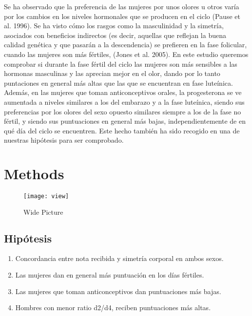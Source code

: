 \documentclass[fleqn,10pt]{SelfArx} %
\begin{document}
Se ha observado que la preferencia de las mujeres por unos olores u otros varía por los cambios en los niveles hormonales que se producen en el ciclo (Pause et al. 1996). Se ha visto cómo los rasgos como la masculinidad y la simetría, asociados con beneficios indirectos (es decir, aquellas que reflejan la buena calidad genética y que pasarán a la descendencia) se prefieren en la fase folicular, cuando las mujeres son más fértiles, (Jones et al. 2005). En este estudio queremos comprobar si durante la fase fértil del ciclo las mujeres son más sensibles a las hormonas masculinas y las aprecian mejor en el olor, dando por lo tanto puntaciones en general más altas que las que se encuentran en fase luteínica. Además, en las mujeres que toman anticonceptivos orales, la progesterona se ve aumentada a niveles similares a los del embarazo y a la fase luteínica, siendo sus preferencias por los olores del sexo opuesto similares siempre a los de la fase no fértil, y siendo sus puntuaciones en general más bajas, independientemente de en qué día del ciclo se encuentren. Este hecho también ha sido recogido en una de nuestras hipótesis para ser comprobado.


\section{Methods}

\begin{figure*}[ht]\centering %
	\texttt{[image: view]}
	\caption{Wide Picture}
	\label{fig:view}
\end{figure*}

\subsection{Hipótesis}

\begin{enumerate}[noitemsep] %
	\item Concordancia entre nota recibida y simetría corporal en ambos sexos.
	\item Las mujeres dan en general más puntuación en los días fértiles.
	\item Las mujeres que toman anticonceptivos dan puntuaciones más bajas.
	\item Hombres con menor ratio d2/d4, reciben puntuaciones más altas.
\end{enumerate}
\end{document}
